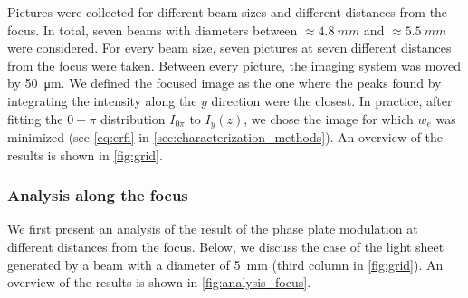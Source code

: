 Pictures were collected for different beam sizes and different distances from the focus. In total, seven beams with diameters between $\approx\SI{4.8}{mm}$ and $\approx\SI{5.5}{mm}$ were considered. For every beam size, seven pictures at seven different distances from the focus were taken. Between every picture, the imaging system was moved by \SI{50}{\micro m}. We defined the focused image as the one where the peaks found by integrating the intensity along the $y$ direction were the closest. In practice, after fitting the $0-\pi$ distribution $I_{0\pi}$ to $I_y(z)$, we chose the image for which $w_e$ was minimized (see \cref{eq:erfi} in \cref{sec:characterization_methods}). An overview of the results is shown in \cref{fig:grid}.

\subsubsection{Analysis along the focus}
We first present an analysis of the result of the phase plate modulation at different distances from the focus. Below, we discuss the case of the light sheet generated by a beam with a diameter of \SI{5}{mm} (third column in \cref{fig:grid}). An overview of the results is shown in \cref{fig:analysis_focus}.

